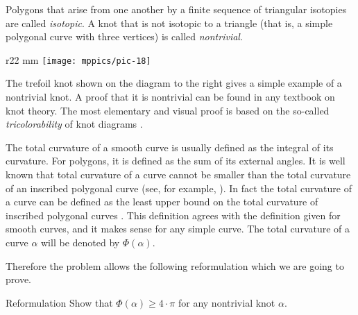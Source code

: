 Polygons that arise from one another by a finite sequence of
triangular isotopies are called \emph{isotopic}.
A knot that is not isotopic to a triangle (that is, a simple polygonal curve with three vertices) is called \emph{nontrivial}.

\begin{wrapfigure}{r}{22 mm}
\vskip-3mm
\centering
\texttt{[image: mppics/pic-18]}
\vskip0mm
\end{wrapfigure}

The trefoil knot shown on the diagram to the right gives a simple example of a nontrivial knot.
A proof that it is nontrivial can be found in any textbook on knot theory.
The most elementary and visual proof is based on the so-called \emph{tricolorability} of knot diagrams \cite[Section 1.5]{adams}.

The total curvature of a smooth curve is usually defined as the integral of its curvature.
For polygons, it is defined as the sum of its external angles.
It is well known that total curvature of a curve cannot be smaller than the total curvature of an inscribed polygonal curve (see, for example, \cite{petrunin-zamora}).
In fact the total curvature of a curve can be defined as the least upper bound on the total curvature of inscribed polygonal curves \cite{aleksandrov-reshetnyak, sullivan-curves}.
This definition agrees with the definition given for smooth curves, and it makes sense for any simple curve.
The total curvature of a curve $\alpha$ will be denoted by $\Phi(\alpha)$.

Therefore the problem allows the following reformulation which we are going to prove.

\begin{thm}{Reformulation}\label{thm:fary-milnor}
Show that $\Phi(\alpha)\ge 4\cdot\pi$ for any nontrivial knot $\alpha$. 
\end{thm} 


